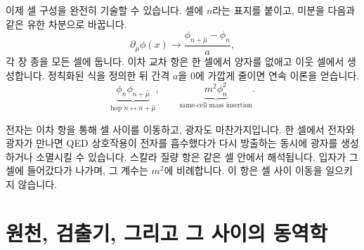 이제 셀 구성을 완전히 기술할 수 있습니다. 셀에 \(n\)라는 표지를 붙이고, 미분을 다음과 같은 유한 차분으로 바꿉니다.
\begin{equation}
\partial_\mu\phi(x)
\longrightarrow
\frac{\phi_{n+\hat\mu}-\phi_n}{a},
\end{equation}
각 장 종을 모든 셀에 둡니다. 이차 교차 항은 한 셀에서 양자를 없애고 이웃 셀에서 생성합니다. 정칙화된 식을 정의한 뒤 간격 \(a\)을 0에 가깝게 줄이면 연속 이론을 얻습니다.
\begin{equation}
\underbrace{\phi_n\phi_{n+\hat\mu}}_{\text{hop }n\leftrightarrow n+\hat\mu},
\qquad
\underbrace{m^2\phi_n^2}_{\text{same-cell mass insertion}}.
\end{equation}

\begin{classroomqa}
\end{classroomqa}

전자는 이차 항을 통해 셀 사이를 이동하고, 광자도 마찬가지입니다. 한 셀에서 전자와 광자가 만나면 QED 상호작용이 전자를 흡수했다가 다시 방출하는 동시에 광자를 생성하거나 소멸시킬 수 있습니다. 스칼라 질량 항은 같은 셀 안에서 해석됩니다. 입자가 그 셀에 들어갔다가 나가며, 그 계수는 \(m^2\)에 비례합니다. 이 항은 셀 사이 이동을 일으키지 않습니다.

\begin{classroomqa}
\end{classroomqa}

\begin{classroomqa}
\end{classroomqa}

\section{원천, 검출기, 그리고 그 사이의 동역학}

